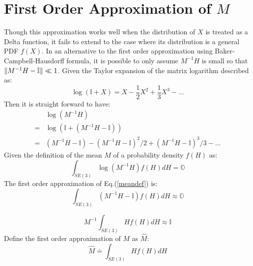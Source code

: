 \documentclass[twocolumn,10pt]{asme2ej}
\DeclarePairedDelimiter{\norm}{\lVert}{\rVert}
\newcommand{\II}{\mathbb{I}}
\begin{document}
\section{First Order Approximation of $M$}
Though this approximation works well when the distribution of $X$ is treated as a Delta function, it fails to extend to the case where its distribution is a general PDF $f(X)$. In an alternative to the first order approximation using Baker-Campbell-Hausdorff formula, it is possible to only assume $M^{-1}H$ is small so that $\norm{M^{-1}H - \II} \ll 1$. Given the Taylor expansion of the matrix logarithm described as:
\begin{equation}
\log(\II + X) = X - \dfrac{1}{2}X^2 + \dfrac{1}{3}X^3 - ...
\end{equation}
Then it is straight forward to have:
\begin{equation}
\begin{split}
&\log(M^{-1}H) \\ 
= &\log(\II + (M^{-1}H - \II)) \\ 
= &\left(M^{-1}H - \II \right) - \left(M^{-1}H - \II \right)^2/2 + \left(M^{-1}H - \II \right)^3/3 - ...
\end{split}
\end{equation}
Given the definition of the mean $M$ of a probability density $f(H)$ as:
\begin{equation} 
\int_{SE(3)} \log(M^{-1} H) f(H) dH = \mathbb{O}  
\label{meandef} 
\end{equation}
The first order approximation of Eq.(\ref{meandef}) is:
\begin{equation}
\int_{SE(3)} (M^{-1}H - \II) f(H)dH \approx \mathbb{O}
\end{equation}

\begin{equation}
M^{-1}\int_{SE(3)} H f(H)dH \approx \II
\end{equation}
Define the first order approximation of $M$ as $\widehat{M}$:
\begin{equation}
\widehat{M} \doteq \int_{SE(3)}Hf(H)dH
\label{1st}
\end{equation}
\end{document}
